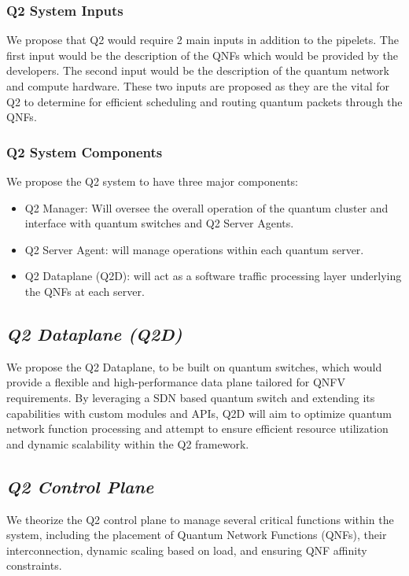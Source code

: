 \documentclass[sigplan,screen]{acmart}
\begin{document}
\subsubsection{Q2 System Inputs}
We propose that Q2 would require 2 main inputs in addition to the pipelets.  The first input would be the description of the QNFs which would be provided by the developers. The second input would be the description of the quantum network and compute hardware. These two inputs are proposed as they are the vital for Q2 to determine for efficient scheduling and routing quantum packets through the QNFs.

\subsubsection{Q2 System Components}
We propose the Q2 system to have three major components:
\begin{itemize}
    \item Q2 Manager: Will oversee the overall operation of the quantum cluster and interface with quantum switches and Q2 Server Agents.
    \item Q2 Server Agent: will manage operations within each quantum server.
    \item Q2 Dataplane (Q2D): will act as a software traffic processing layer underlying the QNFs at each server.
\end{itemize}

\subsection{\textit{Q2 Dataplane (Q2D)}}
We propose the Q2 Dataplane, to be built on quantum switches, which would provide a flexible and high-performance data plane tailored for QNFV requirements. By leveraging a SDN based quantum switch \cite{quantumswitch_sdn} and extending its capabilities with custom modules and APIs, Q2D will aim to optimize quantum network function processing and attempt to ensure efficient resource utilization and dynamic scalability within the Q2 framework.

\subsection{\textit{Q2 Control Plane}}
We theorize the Q2 control plane to manage several critical functions within the system, including the placement of Quantum Network Functions (QNFs), their interconnection, dynamic scaling based on load, and ensuring QNF affinity constraints.
\end{document}
